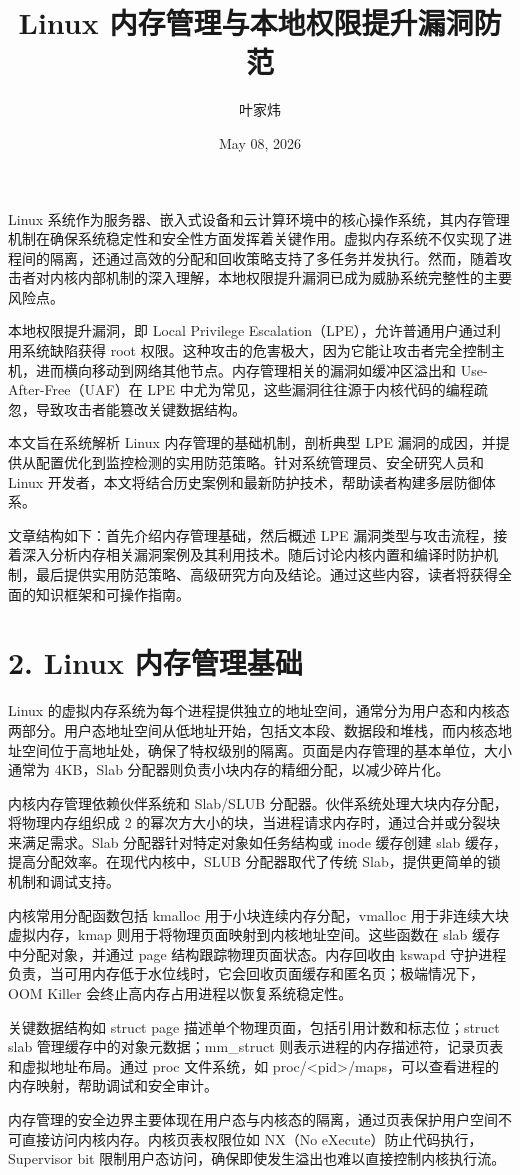 \title{Linux 内存管理与本地权限提升漏洞防范}
\author{叶家炜}
\date{May 08, 2026}
\maketitle
Linux 系统作为服务器、嵌入式设备和云计算环境中的核心操作系统，其内存管理机制在确保系统稳定性和安全性方面发挥着关键作用。虚拟内存系统不仅实现了进程间的隔离，还通过高效的分配和回收策略支持了多任务并发执行。然而，随着攻击者对内核内部机制的深入理解，本地权限提升漏洞已成为威胁系统完整性的主要风险点。\par
本地权限提升漏洞，即 Local Privilege Escalation（LPE），允许普通用户通过利用系统缺陷获得 root 权限。这种攻击的危害极大，因为它能让攻击者完全控制主机，进而横向移动到网络其他节点。内存管理相关的漏洞如缓冲区溢出和 Use-After-Free（UAF）在 LPE 中尤为常见，这些漏洞往往源于内核代码的编程疏忽，导致攻击者能篡改关键数据结构。\par
本文旨在系统解析 Linux 内存管理的基础机制，剖析典型 LPE 漏洞的成因，并提供从配置优化到监控检测的实用防范策略。针对系统管理员、安全研究人员和 Linux 开发者，本文将结合历史案例和最新防护技术，帮助读者构建多层防御体系。\par
文章结构如下：首先介绍内存管理基础，然后概述 LPE 漏洞类型与攻击流程，接着深入分析内存相关漏洞案例及其利用技术。随后讨论内核内置和编译时防护机制，最后提供实用防范策略、高级研究方向及结论。通过这些内容，读者将获得全面的知识框架和可操作指南。\par
\chapter{2. Linux 内存管理基础}
Linux 的虚拟内存系统为每个进程提供独立的地址空间，通常分为用户态和内核态两部分。用户态地址空间从低地址开始，包括文本段、数据段和堆栈，而内核态地址空间位于高地址处，确保了特权级别的隔离。页面是内存管理的基本单位，大小通常为 4KB，Slab 分配器则负责小块内存的精细分配，以减少碎片化。\par
内核内存管理依赖伙伴系统和 Slab/SLUB 分配器。伙伴系统处理大块内存分配，将物理内存组织成 2 的幂次方大小的块，当进程请求内存时，通过合并或分裂块来满足需求。Slab 分配器针对特定对象如任务结构或 inode 缓存创建 slab 缓存，提高分配效率。在现代内核中，SLUB 分配器取代了传统 Slab，提供更简单的锁机制和调试支持。\par
内核常用分配函数包括 kmalloc 用于小块连续内存分配，vmalloc 用于非连续大块虚拟内存，kmap 则用于将物理页面映射到内核地址空间。这些函数在 slab 缓存中分配对象，并通过 page 结构跟踪物理页面状态。内存回收由 kswapd 守护进程负责，当可用内存低于水位线时，它会回收页面缓存和匿名页；极端情况下，OOM Killer 会终止高内存占用进程以恢复系统稳定性。\par
关键数据结构如 struct page 描述单个物理页面，包括引用计数和标志位；struct slab 管理缓存中的对象元数据；mm\_{}struct 则表示进程的内存描述符，记录页表和虚拟地址布局。通过 proc 文件系统，如 proc/<pid>/maps，可以查看进程的内存映射，帮助调试和安全审计。\par
内存管理的安全边界主要体现在用户态与内核态的隔离，通过页表保护用户空间不可直接访问内核内存。内核页表权限位如 NX（No eXecute）防止代码执行，Supervisor bit 限制用户态访问，确保即使发生溢出也难以直接控制内核执行流。\par
